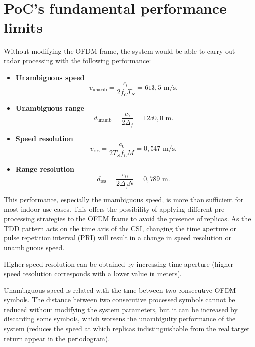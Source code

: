 \section{PoC's fundamental performance limits}

Without modifying the OFDM frame, the system would be able to carry out radar processing with the following performance:

\begin{itemize}
	\item \textbf{Unambiguous speed}
	\vspace{-\baselineskip} %
	\begin{equation}
		v_{\text{unamb}} = \frac{c_0}{2f_C T_S} = 613,5\text{ m/s}.
	\end{equation}
	
	\item \textbf{Unambiguous range}
	\begin{equation}
		d_{\text{unamb}} = \frac{c_0}{2\Delta_f} = 1250,0\text{ m}.
	\end{equation}
	\item \textbf{Speed resolution}
	\begin{equation}
		v_{\text{res}} = \frac{c_0}{2T_Sf_CM} = 0,547 \text{ m/s}.
	\end{equation} 
	\item \textbf{Range resolution}
	\begin{equation}
		d_{\text{res}} = \frac{c_0}{2\Delta_fN} = 0,789 \text{ m}.
	\end{equation}  
\end{itemize}
	
	This performance, especially the unambiguous speed, is more than sufficient for most indoor use cases. 
	This offers the possibility of applying different pre-processing strategies to the OFDM frame to avoid the presence of replicas. 
	As the TDD pattern acts on the time axis of the CSI, changing the time aperture or pulse repetition interval (PRI) will result in a change in speed resolution or unambiguous speed.
	
	Higher speed resolution can be obtained by increasing time aperture (higher speed resolution corresponds with a lower value in meters).
	
	Unambiguous speed is related with the time between two consecutive OFDM symbols. The distance between two consecutive processed symbols cannot be reduced without modifying the system parameters, but it can be increased by discarding some symbols, which worsens the unambiguity performance of the system (reduces the speed at which replicas indistinguishable from the real target return appear in the periodogram).
	
